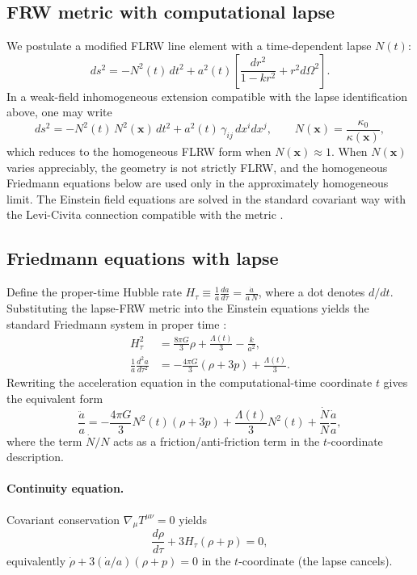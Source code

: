 \subsection{FRW metric with computational lapse}
We postulate a modified FLRW line element with a time-dependent lapse $N(t)$:
\begin{equation}
    ds^2 = -N^2(t)\,dt^2 + a^2(t) \left[ \frac{dr^2}{1-kr^2} + r^2 d\Omega^2 \right].
\end{equation}
In a weak-field inhomogeneous extension compatible with the lapse identification above, one may write
\begin{equation}
    ds^2 = -N^2(t)\,N^2(\mathbf{x})\,dt^2 + a^2(t)\,\gamma_{ij}\,dx^i dx^j,
    \qquad N(\mathbf{x})=\frac{\kappa_0}{\kappa(\mathbf{x})},
\end{equation}
which reduces to the homogeneous FLRW form when $N(\mathbf{x})\approx 1$. When $N(\mathbf{x})$ varies appreciably, the geometry is not strictly FLRW, and the homogeneous Friedmann equations below are used only in the approximately homogeneous limit.
The Einstein field equations are solved in the standard covariant way with the Levi-Civita connection compatible with the metric \cite{Carroll2004}.

\subsection{Friedmann equations with lapse}
Define the proper-time Hubble rate $H_{\tau}\equiv \frac{1}{a}\frac{da}{d\tau}=\frac{\dot a}{a\,N}$, where a dot denotes $d/dt$. Substituting the lapse-FRW metric into the Einstein equations yields the standard Friedmann system in proper time \cite{Dodelson2003,Carroll2004}:
\begin{align}
    H_{\tau}^2 &= \frac{8\pi G}{3}\rho + \frac{\Lambda(t)}{3} - \frac{k}{a^2}, \\
    \frac{1}{a}\frac{d^2a}{d\tau^2} &= -\frac{4\pi G}{3}\left(\rho+3p\right) + \frac{\Lambda(t)}{3}.
\end{align}
Rewriting the acceleration equation in the computational-time coordinate $t$ gives the equivalent form
\begin{equation}
    \frac{\ddot a}{a}
    =
    -\frac{4\pi G}{3}N^2(t)\left(\rho+3p\right)
    +\frac{\Lambda(t)}{3}N^2(t)
    +\frac{\dot N}{N}\frac{\dot a}{a},
\end{equation}
where the term $\dot N/N$ acts as a friction/anti-friction term in the $t$-coordinate description.

\paragraph{Continuity equation.}
Covariant conservation $\nabla_\mu T^{\mu\nu}=0$ yields
\begin{equation}
    \frac{d\rho}{d\tau} + 3H_{\tau}(\rho+p)=0,
\end{equation}
equivalently $\dot{\rho}+3(\dot a/a)(\rho+p)=0$ in the $t$-coordinate (the lapse cancels).

